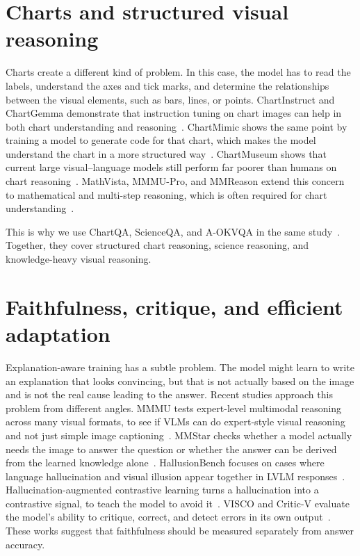 \documentclass[12pt,bibliography=totoc,listof=totoc,BCOR=5mm,DIV=12,oneside,open=any]{scrbook}
\let\cite\citep
\begin{document}
\section{Charts and structured visual reasoning}
Charts create a different kind of problem.
In this case, the model has to read the labels, understand the axes and tick marks,
and determine the relationships between the visual elements, such as bars, lines, or points.
ChartInstruct and ChartGemma demonstrate that instruction tuning on chart images can help in both chart understanding and reasoning~\cite{masry2024chartinstruct,masry2025chartgemma}.
ChartMimic shows the same point by training a model to generate code for that chart, which makes the model understand the chart in a more structured way~\cite{yang2025chartmimic}.
ChartMuseum shows that current large visual--language models still perform far poorer than humans on chart reasoning~\cite{tang2025chartmuseum}.
MathVista, MMMU-Pro, and MMReason extend this concern to mathematical and multi-step reasoning, which is often required for chart understanding~\cite{lu2024mathvista,yue2025mmmupro,yao2025mmreason}.

This is why we use ChartQA, ScienceQA, and A-OKVQA in the same study~\cite{masry2022chartqa,lu2022scienceqa,schwenk2022aokvqa}.
Together, they cover structured chart reasoning, science reasoning, and knowledge-heavy visual reasoning.


\section{Faithfulness, critique, and efficient adaptation}
Explanation-aware training has a subtle problem.
The model might learn to write an explanation that looks convincing,
but that is not actually based on the image and is not the real cause leading to the answer.
Recent studies approach this problem from different angles.
MMMU tests expert-level multimodal reasoning across many visual formats, to see if VLMs can do expert-style visual reasoning and not just simple image captioning~\cite{yue2024mmmu}.
MMStar checks whether a model actually needs the image to answer the question or whether the answer can be derived from the learned knowledge alone~\cite{chen2024mmstar}.
HallusionBench focuses on cases where language hallucination and visual illusion appear together in LVLM responses~\cite{guan2024hallusionbench}.
Hallucination-augmented contrastive learning turns a hallucination into a contrastive signal, to teach the model to avoid it~\cite{jiang2024hacl}.
VISCO and Critic-V evaluate the model's ability to critique, correct, and detect errors in its own output~\cite{wu2025visco,zhang2025criticv}.
These works suggest that faithfulness should be measured separately from answer accuracy.
\end{document}
